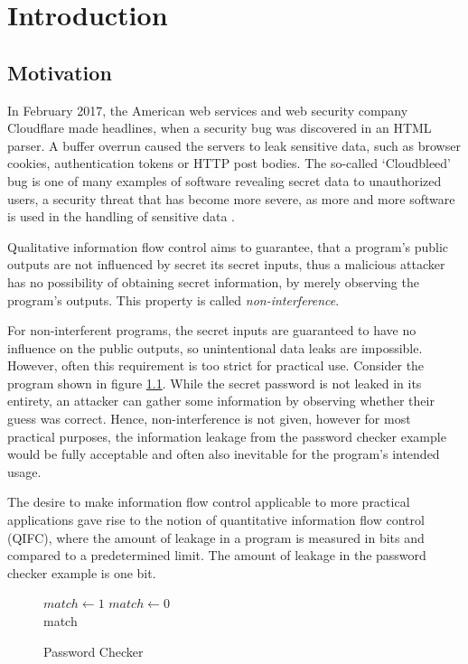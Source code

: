 \chapter{Introduction}\label{sec:intro}

\section{Motivation}

In February 2017, the American web services and web security company Cloudflare made headlines, when a security bug was discovered in an HTML parser. A buffer overrun caused the servers to leak sensitive data, such as browser cookies, authentication tokens or HTTP post bodies. The so-called `Cloudbleed' bug is one of many examples of software revealing secret data to unauthorized users, a security threat that has become more severe, as more and more software is used in the handling of sensitive data \cite{cloudbleedIssue, cloudbleedReport}. 

Qualitative information flow control aims to guarantee, that a program's public outputs are not influenced by secret its secret inputs, thus a malicious attacker has no possibility of obtaining secret information, by merely observing the program's outputs. This property is called \emph{non-interference}. 

For non-interferent programs, the secret inputs are guaranteed to have no influence on the public outputs, so unintentional data leaks are impossible. However, often this requirement is too strict for practical use. Consider the program shown in figure \ref{fig:pwChecker}. While the secret password is not leaked in its entirety, an attacker can gather some information by observing whether their guess was correct. Hence, non-interference is not given, however for most practical purposes, the information leakage from the password checker example would be fully acceptable and often also inevitable for the program's intended usage.

The desire to make information flow control applicable to more practical applications gave rise to the notion of quantitative information flow control (QIFC), where the amount of leakage in a program is measured in bits and compared to a predetermined limit. The amount of leakage in the password checker example is one bit.

\begin{figure}
\centering
\begin{minipage}{.7\linewidth}
    \begin{algorithm}[H]
        \begin{algorithmic}[1]
                \State $match \leftarrow 1$
            \Else
                \State $match \leftarrow 0$
            \EndIf\\
            \Return match
            \EndProcedure
    \end{algorithmic} 
    \end{algorithm}
    \end{minipage}
    \caption{Password Checker}
    \label{fig:pwChecker}
\end{figure}

